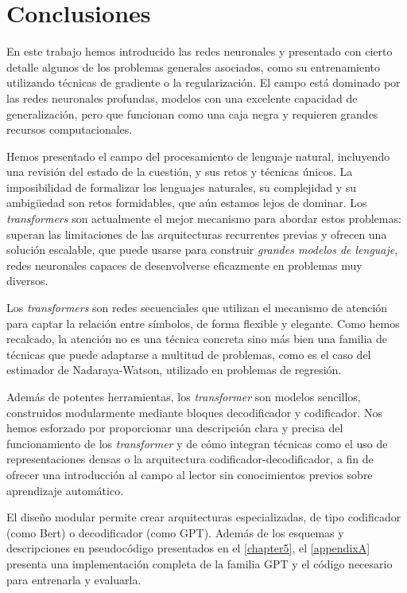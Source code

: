 \chapter{Conclusiones}
En este trabajo hemos introducido las redes neuronales y presentado con cierto detalle algunos de los problemas generales asociados, como su entrenamiento utilizando técnicas de gradiente o la regularización. El campo está dominado por las redes neuronales profundas, modelos con una excelente capacidad de generalización, pero que funcionan como una caja negra y requieren grandes recursos computacionales.

Hemos presentado el campo del procesamiento de lenguaje natural, incluyendo una revisión del estado de la cuestión, y sus retos y técnicas únicos. La imposibilidad de formalizar los lenguajes naturales, su complejidad y su ambigüedad son retos formidables, que aún estamos lejos de dominar. Los \textit{transformers} son actualmente el mejor mecanismo para abordar estos problemas: superan las limitaciones de las arquitecturas recurrentes previas y ofrecen una solución escalable, que puede usarse para construir \textit{grandes modelos de lenguaje}, redes neuronales capaces de desenvolverse eficazmente en problemas muy diversos.

Los \textit{transformers} son redes secuenciales que utilizan el mecanismo de atención para captar la relación entre símbolos, de forma flexible y elegante. Como hemos recalcado, la atención no es una técnica concreta sino más bien una familia de técnicas que puede adaptarse a multitud de problemas, como es el caso del estimador de Nadaraya-Watson, utilizado en problemas de regresión.

Además de potentes herramientas, los \textit{transformer} son modelos sencillos, construidos modularmente mediante bloques decodificador y codificador. Nos hemos esforzado por proporcionar una descripción clara y precisa del funcionamiento de los \textit{transformer} y de cómo integran técnicas como el uso de representaciones densas o la arquitectura codificador-decodificador, a fin de ofrecer una introducción al campo al lector sin conocimientos previos sobre aprendizaje automático.

El diseño modular permite crear arquitecturas especializadas, de tipo codificador (como Bert) o decodificador (como GPT). Además de los esquemas y descripciones en pseudocódigo presentados en el \cref{chapter5}, el \cref{appendixA} presenta una implementación completa de la familia GPT y el código necesario para entrenarla y evaluarla.

